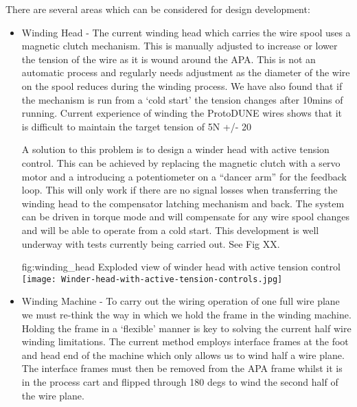 There are several areas which can be considered for design development:
\begin{itemize}
\item Winding Head - The current winding head which carries the wire spool uses a magnetic clutch mechanism. This is manually adjusted to increase or lower the tension of the wire as it is wound around the APA. This is not an automatic process and regularly needs adjustment as the diameter of the wire on the spool reduces during the winding process. We have also found that if the mechanism is run from a `cold start' the tension changes after 10mins of running. Current experience of winding the ProtoDUNE wires shows that it is difficult to maintain the target tension of 5N +/- 20%

A solution to this problem is to design a winder head with active tension control. This can be achieved by replacing the magnetic clutch with a servo motor and a introducing a potentiometer on a ``dancer arm'' for the feedback loop. This will only work if there are no signal losses when transferring the winding head to the compensator latching mechanism and back. The system can be driven in torque mode and will compensate for any wire spool changes and will be able to operate from a cold start. This development is well underway with tests currently being carried out. See Fig XX.

\begin{dunefigure}{fig:winding_head}
{Exploded view of winder head with active tension control}
\texttt{[image: Winder-head-with-active-tension-controls.jpg]}
\end{dunefigure}

\item Winding Machine - To carry out the wiring operation of one full wire plane we must re-think the way in which we hold the frame in the winding machine. Holding the frame in a `flexible' manner is key to solving the current half wire winding limitations. The current method employs interface frames at the foot and head end of the machine which only allows us to wind half a wire plane. The interface frames must then be removed from the APA frame whilst it is in the process cart and flipped through 180 degs to wind the second half of the wire plane.


\end{itemize}
